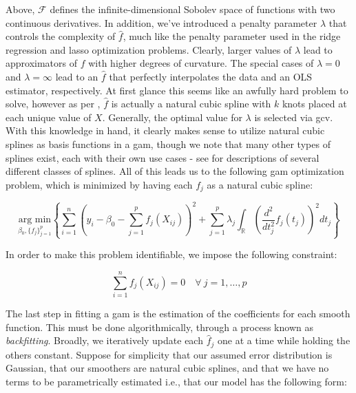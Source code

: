 \documentclass{report}
\begin{document}
Above, $\mathcal{F}$ defines the infinite-dimensional Sobolev space of functions with two continuous derivatives. In addition, we've introduced a penalty parameter $\lambda$ that controls the complexity of $\hat{f}$, much like the penalty parameter used in the ridge regression and \gls{lasso} optimization problems. Clearly, larger values of $\lambda$ lead to approximators of $f$ with higher degrees of curvature. The special cases of $\lambda = 0$ and $\lambda = \infty$ lead to an $\hat{f}$ that perfectly interpolates the data and an OLS estimator, respectively. At first glance this seems like an awfully hard problem to solve, however as per \cite[Lecture~7]{molstad_sta_2022}, $\hat{f}$ is actually a natural cubic spline with $k$ knots placed at each unique value of $X$. Generally, the optimal value for $\lambda$ is selected via \gls{gcv}. With this knowledge in hand, it clearly makes sense to utilize natural cubic splines as basis functions in a \gls{gam}, though we note that many other types of splines exist, each with their own use cases - see \cite[Chapter~5]{wood_generalized_2017} for descriptions of several different classes of splines. All of this leads us to the following \gls{gam} optimization problem, which is minimized by having each $f_j$ as a natural cubic spline:

\begin{equation}\label{eq:glm-gam-optimization-problem}
    \underset{\beta_0, \{f_j\}_{j=1}^p}{\text{arg min}} \left\{\sum_{i=1}^n \left(y_i - \beta_0 - \sum_{j=1}^p f_j(X_{ij})\right)^2 + \sum_{j=1}^p \lambda_j \int_{\mathbb{R}} \left(\frac{d^2}{dt_j^2} f_j(t_j)\right)^2 dt_j\right\}
\end{equation}

In order to make this problem identifiable, we impose the following constraint:

\begin{equation}\label{eq:glm-gam-optimization-problem-constraint}
    \sum_{i=1}^n f_j(X_{ij}) = 0 \quad \forall \: j = 1, \dots, p
\end{equation}

The last step in fitting a \gls{gam} is the estimation of the coefficients for each smooth function. This must be done algorithmically, through a process known as \textit{backfitting}. Broadly, we iteratively update each $\hat{f}_j$ one at a time while holding the others constant. Suppose for simplicity that our assumed error distribution is Gaussian, that our smoothers are natural cubic splines, and that we have no terms to be parametrically estimated i.e., that our model has the following form:
\end{document}
